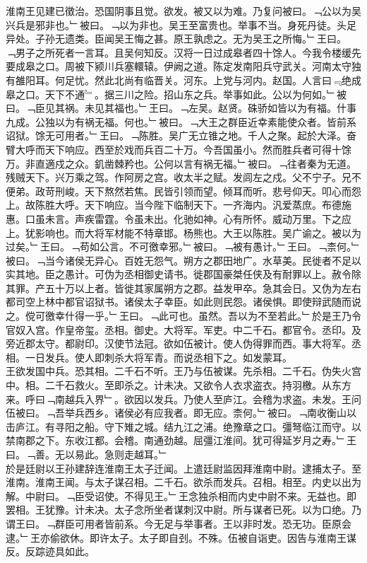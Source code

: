 \documentclass{zhvt-classic}
\begin{document}
\hspace*{2em}淮南王见建已徵治。恐国阴事且觉。欲发。被又以为难。乃复问被曰。﹁公以为吴兴兵是邪非也。﹂被曰。﹁以为非也。吴王至富贵也。举事不当。身死丹徒。头足异处。子孙无遗类。臣闻吴王悔之甚。原王孰虑之。无为吴王之所悔。﹂王曰。﹁男子之所死者一言耳。且吴何知反。汉将一日过成皋者四十馀人。今我令楼缓先要成皋之口。周被下颍川兵塞轘辕。伊阙之道。陈定发南阳兵守武关。河南太守独有雒阳耳。何足忧。然此北尚有临晋关。河东。上党与河内。赵国。人言曰﹃绝成皋之口。天下不通﹄。据三川之险。招山东之兵。举事如此。公以为何如。﹂被曰。﹁臣见其祸。未见其福也。﹂王曰。﹁左吴。赵贤。硃骄如皆以为有福。什事九成。公独以为有祸无福。何也。﹂被曰。﹁大王之群臣近幸素能使众者。皆前系诏狱。馀无可用者。﹂王曰。﹁陈胜。吴广无立锥之地。千人之聚。起於大泽。奋臂大呼而天下响应。西至於戏而兵百二十万。今吾国虽小。然而胜兵者可得十馀万。非直適戍之众。釠凿棘矜也。公何以言有祸无福。﹂被曰。﹁往者秦为无道。残贼天下。兴万乘之驾。作阿房之宫。收太半之赋。发闾左之戍。父不宁子。兄不便弟。政苛刑峻。天下熬然若焦。民皆引领而望。倾耳而听。悲号仰天。叩心而怨上。故陈胜大呼。天下响应。当今陛下临制天下。一齐海内。汎爱蒸庶。布德施惠。口虽未言。声疾雷霆。令虽未出。化驰如神。心有所怀。威动万里。下之应上。犹影响也。而大将军材能不特章邯。杨熊也。大王以陈胜。吴广谕之。被以为过矣。﹂王曰。﹁苟如公言。不可徼幸邪。﹂被曰。﹁被有愚计。﹂王曰。﹁柰何。﹂被曰。﹁当今诸侯无异心。百姓无怨气。朔方之郡田地广。水草美。民徙者不足以实其地。臣之愚计。可伪为丞相御史请书。徙郡国豪桀任侠及有耐罪以上。赦令除其罪。产五十万以上者。皆徙其家属朔方之郡。益发甲卒。急其会日。又伪为左右都司空上林中都官诏狱书。诸侯太子幸臣。如此则民怨。诸侯惧。即使辩武随而说之。傥可徼幸什得一乎。﹂王曰。﹁此可也。虽然。吾以为不至若此。﹂於是王乃令官奴入宫。作皇帝玺。丞相。御史。大将军。军吏。中二千石。都官令。丞印。及旁近郡太守。都尉印。汉使节法冠。欲如伍被计。使人伪得罪而西。事大将军。丞相。一日发兵。使人即刺杀大将军青。而说丞相下之。如发蒙耳。\\
\hspace*{2em}王欲发国中兵。恐其相。二千石不听。王乃与伍被谋。先杀相。二千石。伪失火宫中。相。二千石救火。至即杀之。计未决。又欲令人衣求盗衣。持羽檄。从东方来。呼曰﹁南越兵入界﹂。欲因以发兵。乃使人至庐江。会稽为求盗。未发。王问伍被曰。﹁吾举兵西乡。诸侯必有应我者。即无应。柰何。﹂被曰。﹁南收衡山以击庐江。有寻阳之船。守下雉之城。结九江之浦。绝豫章之口。彊弩临江而守。以禁南郡之下。东收江都。会稽。南通劲越。屈彊江淮间。犹可得延岁月之寿。﹂王曰。﹁善。无以易此。急则走越耳。﹂\\
\hspace*{2em}於是廷尉以王孙建辞连淮南王太子迁闻。上遣廷尉监因拜淮南中尉。逮捕太子。至淮南。淮南王闻。与太子谋召相。二千石。欲杀而发兵。召相。相至。内史以出为解。中尉曰。﹁臣受诏使。不得见王。﹂王念独杀相而内史中尉不来。无益也。即罢相。王犹豫。计未决。太子念所坐者谋刺汉中尉。所与谋者已死。以为口绝。乃谓王曰。﹁群臣可用者皆前系。今无足与举事者。王以非时发。恐无功。臣原会逮。﹂王亦偷欲休。即许太子。太子即自刭。不殊。伍被自诣吏。因告与淮南王谋反。反踪迹具如此。\\
\end{document}
